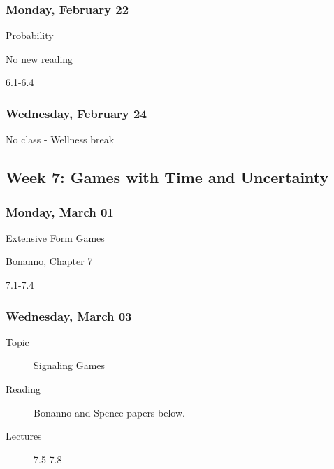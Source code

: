 \documentclass[
]{article}
\providecommand{\tightlist}{%
  \setlength{\itemsep}{0pt}\setlength{\parskip}{0pt}}
\begin{document}
\begin{multicols}{2}

\hypertarget{monday-february-22}{%
\subsubsection{Monday, February 22}\label{monday-february-22}}

\begin{description}
\tightlist
\item[Topic]
Probability
\item[Reading]
No new reading
\item[Lectures]
6.1-6.4
\end{description}

\columnbreak

\hypertarget{wednesday-february-24}{%
\subsubsection{Wednesday, February 24}\label{wednesday-february-24}}

No class - Wellness break

\end{multicols}

\hypertarget{week-7-games-with-time-and-uncertainty}{%
\subsection{Week 7: Games with Time and
Uncertainty}\label{week-7-games-with-time-and-uncertainty}}

\begin{multicols}{2}

\hypertarget{monday-march-01}{%
\subsubsection{Monday, March 01}\label{monday-march-01}}

\begin{description}
\tightlist
\item[Topic]
Extensive Form Games
\item[Reading]
Bonanno, Chapter 7
\item[Lectures]
7.1-7.4
\end{description}

\hypertarget{wednesday-march-03}{%
\subsubsection{Wednesday, March 03}\label{wednesday-march-03}}

\begin{description}
\item[Topic]
Signaling Games
\item[Reading]
Bonanno and Spence papers below.
\item[Lectures]
7.5-7.8
\end{description}

\end{multicols}
\end{document}
